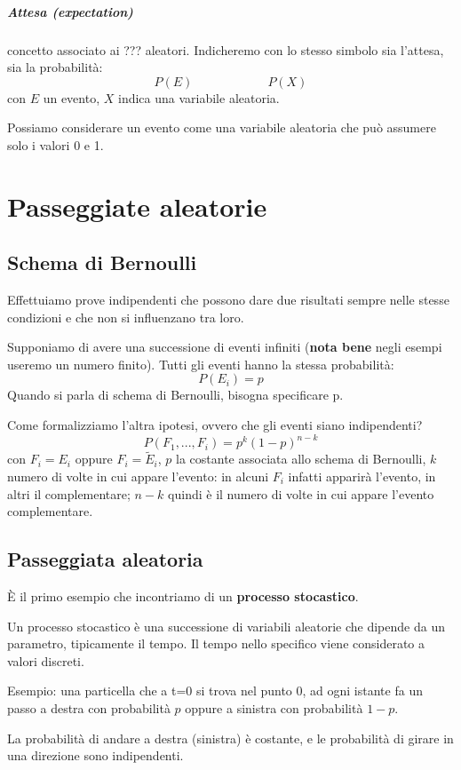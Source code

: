 \documentclass[a4paper,12pt]{book}
\begin{document}
\paragraph{Attesa (expectation)} concetto associato ai ??? aleatori.  
Indicheremo con lo stesso simbolo sia l'attesa, sia la probabilità: $$P(E) \qquad \qquad \qquad P(X)$$ con $E$ un evento, $ X $ indica una variabile aleatoria. 

Possiamo considerare un evento come una variabile aleatoria che può assumere solo i valori 0 e 1. 

\chapter{Passeggiate aleatorie}
\section{Schema di Bernoulli}
Effettuiamo prove indipendenti che possono dare due risultati sempre nelle stesse condizioni e che non si influenzano tra loro. 

Supponiamo di avere una successione di eventi infiniti (\textbf{nota bene} negli esempi useremo un numero finito).
Tutti gli eventi hanno la stessa probabilità:
$$P(E_i) = p$$
Quando si parla di schema di Bernoulli, bisogna specificare p.

Come formalizziamo l'altra ipotesi, ovvero che gli eventi siano indipendenti?
$$P (F_1, ..., F_i ) = p^k(1-p)^{n-k}$$
con $ F_i = E_i $ oppure $ F_i = \widetilde{E}_i $, $ p $ la costante associata allo schema di Bernoulli, $ k $ numero di volte in cui appare l'evento: in alcuni $ F_i $ infatti apparirà l'evento, in altri il complementare; $ n-k $ quindi è il numero di volte in cui appare l'evento complementare.

\section{Passeggiata aleatoria}
È il primo esempio che incontriamo di un \textbf{processo stocastico}. 

Un processo stocastico è una successione di variabili aleatorie che dipende da un parametro, tipicamente il tempo. Il tempo nello specifico viene considerato a valori discreti. 

Esempio: una particella che a t=0 si trova nel punto 0, ad ogni istante fa un passo a destra con probabilità $ p $ oppure a sinistra con probabilità $ 1-p $. 

La probabilità di andare a destra (sinistra) è costante, e le probabilità di girare in una direzione sono indipendenti. 
\end{document}
